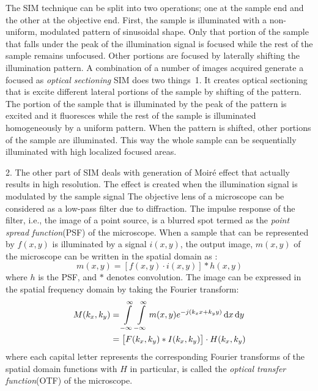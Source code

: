 \documentclass[11pt]{article}
\begin{document}
The SIM technique can be split into two operations; one at the sample end and the other at the objective end. First, the sample is illuminated with a non-uniform, modulated pattern of sinusoidal shape. Only that portion of the sample that falls under the peak of the illumination signal is focused while the rest of the sample remains unfocused. Other portions are focused by laterally shifting the illumination pattern. A combination of a number of images acquired generate a focused  as \emph{optical sectioning}
SIM does two things\
1. It creates optical sectioning that is excite different lateral portions of the sample by shifting of the pattern. The portion of the sample that is illuminated by the peak of the pattern is excited and it fluoresces while the rest of the sample is illuminated homogeneously by a uniform pattern. When the pattern is shifted, other portions of the sample are illuminated. This way the whole sample can be sequentially illuminated with high localized focused areas.

2. The other part of SIM deals with generation of Moiré effect that actually results in high resolution. The effect is created when the illumination signal is modulated by the sample signal
The objective lens of a microscope can be considered as a low-pass filter due to diffraction. The impulse response of the filter, i.e., the image of a point source, is a blurred spot termed as the \emph{point spread function}(PSF) of the microscope. When a sample that can be represented by $f(x,y)$ is illuminated by a signal $i(x,y)$, the output image, $m(x,y)$ of the microscope can be written in the spatial domain as \cite{Jost_2013}:
%
\begin{equation}
  m(x,y) = \left[ f(x,y) \cdot i(x,y) \right] \ast h(x,y)
  \label{eq:microscope}
\end{equation}
%
where $h$ is the PSF, and $\ast$ denotes convolution.
The image can be expressed in the spatial frequency domain by taking the Fourier transform:
%
\begin{equation}
  \begin{split}
    M(k_x, k_y) &= \int \limits_{-\infty}^{\infty} \int \limits_{-\infty}^{\infty}   m(x,y) e^{-j(k_x x + k_y y)} \mathop{}\!\mathrm{d}{x}\mathop{}\!\mathrm{d}{y} \\
    &=  \left[ F(k_x,k_y) \ast I(k_x,k_y) \right] \cdot H(k_x,k_y)
  \end{split}
  \label{eq:FT}
\end{equation}
%
where each capital letter represents the corresponding Fourier transforms of the spatial domain functions with $H$ in particular, is called the \emph{optical transfer function}(OTF) of the microscope.
\end{document}
